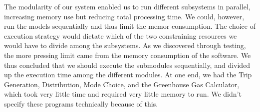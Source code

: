 The modularity of our system enabled us to run different subsystems in
parallel, increasing memory use but reducing total processing time. We
could, however, run the models sequentially and thus limit the memor
consumption. The choice of execution strategy would dictate which of
the two constraining resources we would have to divide among the
subsystems. As we discovered through testing, the more pressing limit
came from the memory consumption of the software. We thus concluded
that we should execute the submodules sequentially, and divided up the
execution time among the different modules. At one end, we had the
Trip Generation, Distribution, Mode Choice, and the Greenhouse Gas
Calculator, which took very little time and required very little
memory to run. We didn't specify these programs technically because of
this.


